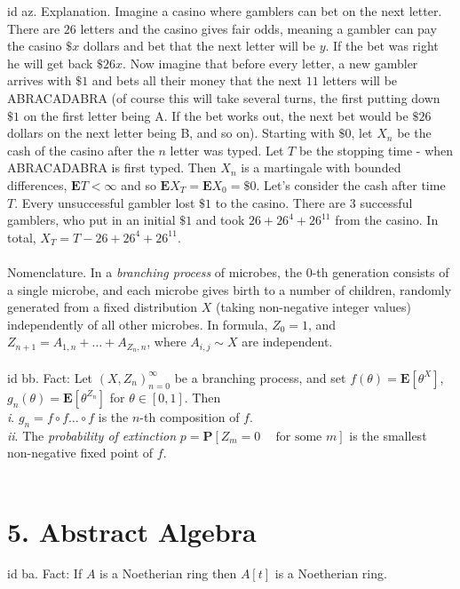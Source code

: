 \documentclass[oneside]{book}
\renewcommand{\P}{\mathbf{P}}
\newcommand{\E}{\mathbf{E}}
\newcommand{\spc}{\phantom{-}}
\renewcommand{\i}{{\it i}. }
\newcommand{\ii}{{\it ii}. }
\newcommand\chap[1]{%
  \chapter*{#1}%
  \addcontentsline{toc}{chapter}{#1}}
\begin{document}
id az. Explanation. Imagine a casino where gamblers can bet on the next letter. There are $26$ letters and the casino gives fair odds, meaning a gambler can pay the casino $\$x$ dollars and bet that the next letter will be $y$. If the bet was right he will get back $\$ 26x$. Now imagine that before every letter, a new gambler arrives with $\$1$ and bets all their money that the next $11$ letters will be ABRACADABRA (of course this will take several turns, the first putting down $\$1$ on the first letter being A. If the bet works out, the next bet would be $\$26$ dollars on the next letter being B, and so on). Starting with $\$0$, let $X_n$ be the cash of the casino after the $n$ letter was typed. Let $T$ be the stopping time - when ABRACADABRA is first typed. Then $X_n$ is a martingale with bounded differences, $\E T<\infty$ and so $\E X_T= \E X_0 = \$0$. Let's consider the cash after time $T$. Every unsuccessful gambler lost $\$1$ to the casino. There are $3$ successful gamblers, who put in an initial $\$1$ and took $26+26^4+26^{11}$ from the casino. In total, $X_{T}=T-26+26^4+26^{11}$.    \\\\


Nomenclature. In a {\it branching process} of microbes, the $0$-th generation consists of a single microbe, and each microbe gives birth to a number of children, randomly generated from a fixed distribution $X$ (taking non-negative integer values) independently of all other microbes. In formula, $Z_0=1$, and $Z_{n+1}=A_{1,n}+\dots+A_{Z_n,n}$, where $A_{i,j}\sim X$ are independent.    \\\\


id bb. Fact: Let $(X,Z_n)_{n=0}^\infty$ be a branching process, and set $f(\theta)=\E[\theta^X]$, $g_n(\theta)=\E[\theta^{Z_n}]$ for $\theta\in[0,1]$. Then \\
\i $g_n=f\circ f\dots \circ f$ is the $n$-th composition of $f$.\\
\ii The {\it probability of extinction} $p=\P[Z_m=0 \spc \text{for some }m]$ is the smallest non-negative fixed point of $f$.   \\\\




\newpage
\chap{5. Abstract Algebra}
id ba. Fact: If $A$ is a Noetherian ring then $A[t]$ is a Noetherian ring.  \\\\
\end{document}
